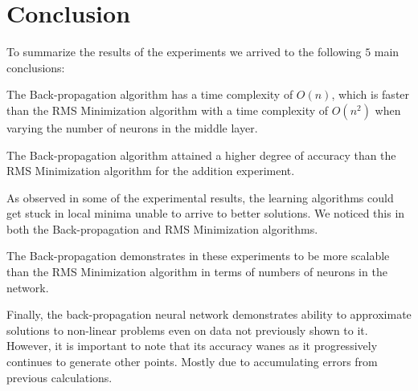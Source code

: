 \documentclass[11pt]{article}
\begin{document}


\section{Conclusion} %
\label{sec:conclusion}

To summarize the results of the experiments we arrived to the following $5$ main conclusions:

The Back-propagation algorithm has a time complexity of $O(n)$, which is faster than the RMS Minimization algorithm with a time
complexity of $O(n^{2})$ when varying the number of neurons in the middle layer.

The Back-propagation algorithm attained a higher degree of accuracy than the RMS Minimization algorithm for the addition experiment.

As observed in some of the experimental results, the learning algorithms could get stuck in local minima unable to arrive to better
solutions. We noticed this in both the Back-propagation and RMS Minimization algorithms.

The Back-propagation demonstrates in these experiments to be more scalable than the RMS Minimization algorithm in terms of numbers of
neurons in the network. 

Finally, the back-propagation neural network demonstrates ability to approximate solutions to non-linear problems even on data not
previously shown to it. However, it is important to note that its accuracy wanes as it progressively continues to generate other points.
Mostly due to accumulating errors from previous calculations.





\end{document}
